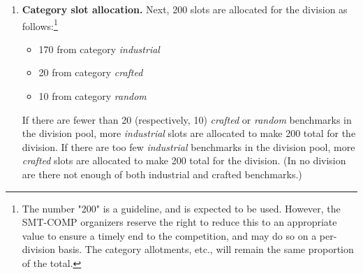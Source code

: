 \documentclass[12pt]{article}
\begin{document}
\begin{enumerate}
\item\textbf{Category slot allocation.} %
  Next, 200 slots are allocated for the division as follows:\footnote{The
  number "200" is a guideline, and is expected to be used.  However, the
  SMT-COMP organizers reserve the right to reduce this to an appropriate
  value to ensure a timely end to the competition, and may do so on a
  per-division basis.  The category allotments, etc., will remain the same
  proportion of the total.}
%
  \begin{itemize}
  \item 170 from category \emph{industrial}
  \item 20 from category \emph{crafted}
  \item 10 from category \emph{random}
  \end{itemize}
%
  If there are fewer than 20 (respectively, 10) \emph{crafted} or
  \emph{random} benchmarks in the division pool, more
  \emph{industrial} slots are allocated to make 200 total for the
  division.  If there are too few \emph{industrial} benchmarks in the
  division pool, more \emph{crafted} slots are allocated to make 200
  total for the division.  (In no division are there not enough of
  both industrial and crafted benchmarks.)


\end{enumerate}
\end{document}
